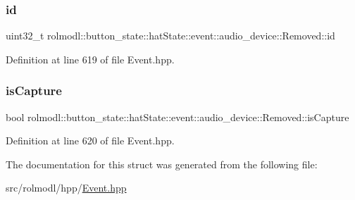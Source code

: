 \subsubsection{\texorpdfstring{id}{id}}
{\footnotesize\ttfamily uint32\+\_\+t rolmodl\+::button\+\_\+state\+::hat\+State\+::event\+::audio\+\_\+device\+::\+Removed\+::id}



Definition at line 619 of file Event.\+hpp.

\mbox{\label{structrolmodl_1_1button__state_1_1hat_state_1_1event_1_1audio__device_1_1_removed_a6cf59651c36436c5d2aeb9abea7c7116}} 
\subsubsection{\texorpdfstring{isCapture}{isCapture}}
{\footnotesize\ttfamily bool rolmodl\+::button\+\_\+state\+::hat\+State\+::event\+::audio\+\_\+device\+::\+Removed\+::is\+Capture}



Definition at line 620 of file Event.\+hpp.



The documentation for this struct was generated from the following file\+:\begin{DoxyCompactItemize}
\item 
src/rolmodl/hpp/\mbox{\hyperlink{_event_8hpp}{Event.\+hpp}}\end{DoxyCompactItemize}
